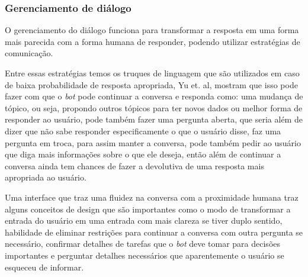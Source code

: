 \documentclass[
	12pt,				%
	oneside,
	a4paper,			%
	english,			%
	french,				%
	spanish,			%
	brazil				%
	]{abntex2}
\begin{document}
\subsubsection{Gerenciamento de diálogo}
O gerenciamento do diálogo funciona para transformar a resposta em uma forma mais parecida com a forma humana de responder, podendo utilizar estratégias de comunicação.

Entre essas estratégias temos os truques de linguagem que são utilizados em caso de baixa probabilidade de resposta apropriada, Yu et. al\supercite{dialogue-manag.}, mostram que isso pode fazer com que o \emph{bot} pode continuar a conversa e responda como: uma mudança de tópico, ou seja, propondo outros tópicos para ter novos dados ou melhor forma de responder ao usuário, pode também fazer uma pergunta aberta, que seria além de dizer que não sabe responder especificamente o que o usuário disse, faz uma pergunta em troca, para assim manter a conversa, pode também pedir ao usuário que diga mais informações sobre o que ele deseja, então além de continuar a conversa ainda tem chances de fazer a devolutiva de uma resposta mais apropriada ao usuário.

Uma interface que traz uma fluidez na conversa com a proximidade humana traz alguns conceitos de design que são importantes como o modo de transformar a entrada do usuário em uma entrada com mais clareza se tiver duplo sentido, habilidade de eliminar restrições para continuar a conversa com outra pergunta se necessário, confirmar detalhes  de tarefas que o \emph{bot} deve tomar para decisões importantes e perguntar detalhes necessários que aparentemente o usuário se esqueceu de informar.


\end{document}
